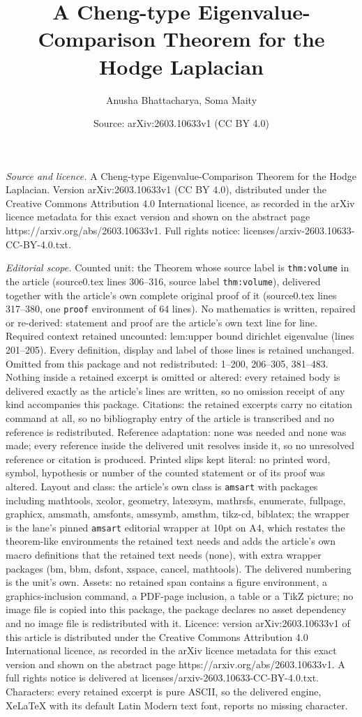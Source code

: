 \documentclass[10pt,a4paper]{amsart}
\title[A Cheng-type Eigenvalue-Comparison Theorem for the Hodge Lap]{A Cheng-type Eigenvalue-Comparison Theorem for the Hodge Laplacian}
\author{Anusha Bhattacharya, Soma Maity}
\date{Source: arXiv:2603.10633v1 (CC BY 4.0)}
\begin{document}
\maketitle

\noindent\emph{Source and licence.} A Cheng-type Eigenvalue-Comparison Theorem for the Hodge Laplacian. Version arXiv:2603.10633v1 (CC BY 4.0), distributed under the Creative Commons Attribution 4.0 International licence, as recorded in the arXiv licence metadata for this exact version and shown on the abstract page https://arxiv.org/abs/2603.10633v1. Full rights notice: licenses/arxiv-2603.10633-CC-BY-4.0.txt.\par\smallskip

\noindent\textit{Editorial scope.} Counted unit: the Theorem whose source label is \texttt{thm:volume} in the article (source0.tex lines 306--316, source label \texttt{thm:volume}), delivered together with the article's own complete original proof of it (source0.tex lines 317--380, one \texttt{proof} environment of 64 lines). No mathematics is written, repaired or re-derived: statement and proof are the article's own text line for line. Required context retained uncounted: lem:upper bound dirichlet eigenvalue (lines 201--205). Every definition, display and label of those lines is retained unchanged. Omitted from this package and not redistributed: 1--200, 206--305, 381--483. Nothing inside a retained excerpt is omitted or altered: every retained body is delivered exactly as the article's lines are written, so no omission receipt of any kind accompanies this package. Citations: the retained excerpts carry no citation command at all, so no bibliography entry of the article is transcribed and no reference is redistributed. Reference adaptation: none was needed and none was made; every reference inside the delivered unit resolves inside it, so no unresolved reference or citation is produced. Printed slips kept literal: no printed word, symbol, hypothesis or number of the counted statement or of its proof was altered. Layout and class: the article's own class is \texttt{amsart} with packages including mathtools, xcolor, geometry, latexsym, mathrsfs, enumerate, fullpage, graphicx, amsmath, amsfonts, amssymb, amsthm, tikz-cd, biblatex; the wrapper is the lane's pinned \texttt{amsart} editorial wrapper at 10pt on A4, which restates the theorem-like environments the retained text needs and adds the article's own macro definitions that the retained text needs (none), with extra wrapper packages (bm, bbm, dsfont, xspace, cancel, mathtools). The delivered numbering is the unit's own. Assets: no retained span contains a figure environment, a graphics-inclusion command, a PDF-page inclusion, a table or a TikZ picture; no image file is copied into this package, the package declares no asset dependency and no image file is redistributed with it. Licence: version arXiv:2603.10633v1 of this article is distributed under the Creative Commons Attribution 4.0 International licence, as recorded in the arXiv licence metadata for this exact version and shown on the abstract page https://arxiv.org/abs/2603.10633v1. A full rights notice is delivered at licenses/arxiv-2603.10633-CC-BY-4.0.txt. Characters: every retained excerpt is pure ASCII, so the delivered engine, XeLaTeX with its default Latin Modern text font, reports no missing character.
\end{document}
